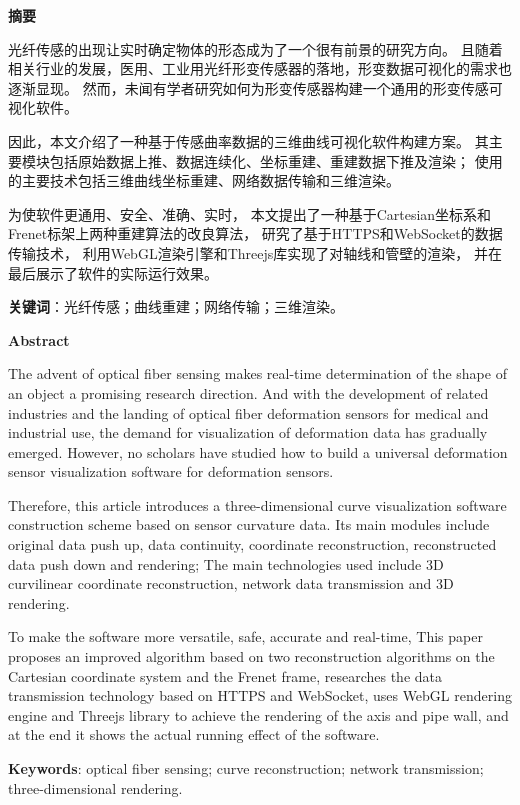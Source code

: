 \clearpage
\begin{center}
    \bfseries {} 摘要
\end{center}

光纤传感的出现让实时确定物体的形态成为了一个很有前景的研究方向。
且随着相关行业的发展，医用、工业用光纤形变传感器的落地，形变数据可视化的需求也逐渐显现。
然而，未闻有学者研究如何为形变传感器构建一个通用的形变传感可视化软件。

因此，本文介绍了一种基于传感曲率数据的三维曲线可视化软件构建方案。
其主要模块包括原始数据上推、数据连续化、坐标重建、重建数据下推及渲染；
使用的主要技术包括三维曲线坐标重建、网络数据传输和三维渲染。

为使软件更通用、安全、准确、实时，
本文提出了一种基于Cartesian坐标系和Frenet标架上两种重建算法的改良算法，
研究了基于HTTPS和WebSocket的数据传输技术，
利用WebGL渲染引擎和Threejs库实现了对轴线和管壁的渲染，
并在最后展示了软件的实际运行效果。

\textbf{关键词}：光纤传感；曲线重建；网络传输；三维渲染。

\clearpage

\begin{center}
    \bfseries {} Abstract
\end{center}

The advent of optical fiber sensing makes real-time determination of the shape of an object a promising research direction.
And with the development of related industries and the landing of optical fiber deformation sensors for medical and industrial use, the demand for visualization of deformation data has gradually emerged.
However, no scholars have studied how to build a universal deformation sensor visualization software for deformation sensors.

Therefore, this article introduces a three-dimensional curve visualization software construction scheme based on sensor curvature data.
Its main modules include original data push up, data continuity, coordinate reconstruction, reconstructed data push down and rendering;
The main technologies used include 3D curvilinear coordinate reconstruction, network data transmission and 3D rendering.

To make the software more versatile, safe, accurate and real-time,
This paper proposes an improved algorithm based on two reconstruction algorithms on the Cartesian coordinate system and the Frenet frame,
researches the data transmission technology based on HTTPS and WebSocket,
uses WebGL rendering engine and Threejs library to achieve the rendering of the axis and pipe wall,
and at the end it shows the actual running effect of the software.

\textbf{Keywords}: optical fiber sensing; curve reconstruction; network transmission; three-dimensional rendering.